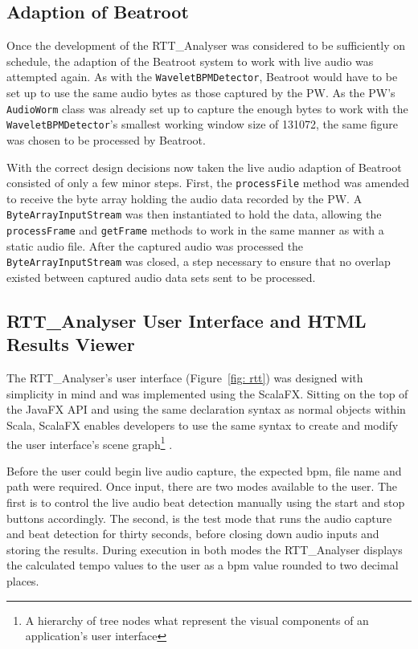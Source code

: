 \documentclass[a4paper, 11pt]{article}
\begin{document}
\subsection{Adaption of Beatroot}
Once the development of the RTT\_Analyser was considered to be sufficiently on schedule, the adaption of the Beatroot system to work with live audio was attempted again. As with the \texttt{WaveletBPMDetector}, Beatroot would have to be set up to use the same audio bytes as those captured by the PW. As the PW's \texttt{AudioWorm} class was already set up to capture the enough bytes to work with the \texttt{WaveletBPMDetector}'s smallest working window size of 131072, the same figure was chosen to be processed by Beatroot. \par

With the correct design decisions now taken the live audio adaption of Beatroot consisted of only a few minor steps. First, the \texttt{processFile} method was amended to receive the byte array holding the audio data recorded by the PW. A \texttt{ByteArrayInputStream} was then instantiated to hold the data, allowing the \texttt{processFrame} and \texttt{getFrame} methods to work in the same manner as with a static audio file. After the captured audio was processed the \texttt{ByteArrayInputStream} was closed, a step necessary to ensure that no overlap existed between captured audio data sets sent to be processed.

\subsection{RTT\_Analyser User Interface and HTML Results Viewer}
The RTT\_Analyser's user interface (Figure~\ref{fig: rtt}) was designed with simplicity in mind and was implemented using the ScalaFX\cite{scalafx}. Sitting on the top of the JavaFX API and using the same declaration syntax as normal objects within Scala, ScalaFX enables developers to use the same syntax to create and modify the user interface's scene graph\footnote{A hierarchy of tree nodes what represent the visual components of an application's user interface\cite{oracle2}} \cite{scalafx}. \par

Before the user could begin live audio capture, the expected bpm, file name and path were required. Once input, there are two modes available to the user. The first is to control the live audio beat detection manually using the start and stop buttons accordingly. The second, is the test mode that runs the audio capture and beat detection for thirty seconds, before closing down audio inputs and storing the results. During execution in both modes the RTT\_Analyser displays the calculated tempo values to the user as a bpm value rounded to two decimal places. \par
\end{document}
